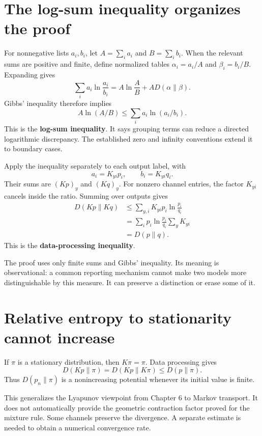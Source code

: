 \documentclass[11pt,oneside,openany]{book}
\theoremstyle{definition}
\theoremstyle{remark}
\numberwithin{equation}{chapter}
\begin{document}
\section{The log-sum inequality organizes the proof}\label{ch10-the-log-sum-inequality-organizes-the-proof}

For nonnegative lists \(a_i,b_i\), let \(A=\sum_i a_i\) and \(B=\sum_i b_i\). When the relevant sums are positive and finite, define normalized tables \(\alpha_i=a_i/A\) and \(\beta_i=b_i/B\). Expanding gives \[\sum_i a_i\ln\frac{a_i}{b_i}
=A\ln\frac AB+A D(\alpha\|\beta).\] Gibbs' inequality therefore implies \[\boxed{A\ln(A/B)\leq\sum_i a_i\ln(a_i/b_i).}\] This is the \textbf{log-sum inequality}. It says grouping terms can reduce a directed logarithmic discrepancy. The established zero and infinity conventions extend it to boundary cases.

Apply the inequality separately to each output label, with \[a_i=K_{yi}p_i,\qquad b_i=K_{yi}q_i.\] Their sums are \((Kp)_y\) and \((Kq)_y\). For nonzero channel entries, the factor \(K_{yi}\) cancels inside the ratio. Summing over outputs gives \[\begin{aligned}
D(Kp\|Kq)
&\leq\sum_{y,i}K_{yi}p_i\ln\frac{p_i}{q_i}\\
&=\sum_i p_i\ln\frac{p_i}{q_i}\sum_yK_{yi}\\
&=D(p\|q).
\end{aligned}\] This is the \textbf{data-processing inequality}.

The proof uses only finite sums and Gibbs' inequality. Its meaning is observational: a common reporting mechanism cannot make two models more distinguishable by this measure. It can preserve a distinction or erase some of it.

\section{Relative entropy to stationarity cannot increase}\label{ch10-relative-entropy-to-stationarity-cannot-increase}

If \(\pi\) is a stationary distribution, then \(K\pi=\pi\). Data processing gives \[D(Kp\|\pi)=D(Kp\|K\pi)\leq D(p\|\pi).\] Thus \(D(p_n\|\pi)\) is a nonincreasing potential whenever its initial value is finite.

This generalizes the Lyapunov viewpoint from Chapter 6 to Markov transport. It does not automatically provide the geometric contraction factor proved for the mixture rule. Some channels preserve the divergence. A separate estimate is needed to obtain a numerical convergence rate.
\end{document}
